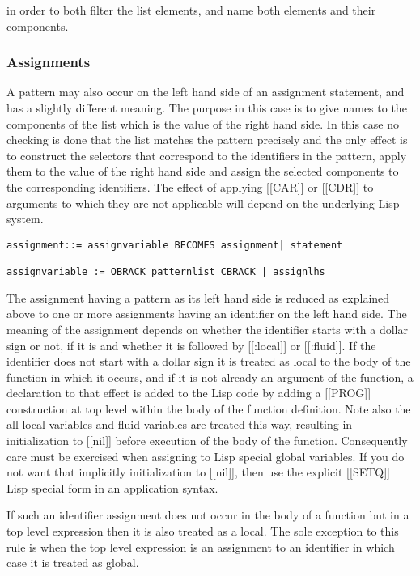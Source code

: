 \documentclass{article}
\begin{document}
in order to both filter the list elements, and name both elements and
their components.

\subsubsection{Assignments}
\label{sec:boot:assignment}

A pattern may also occur on the left hand side of an assignment
statement, and has a slightly different meaning.
The purpose in this case is to give names to the components
of the list which is the value of the right hand side.
In this case no checking
is done that the list matches the pattern precisely and the only
effect is to construct the selectors that correspond to
the identifiers in the pattern, apply them to the value of the
right hand side and assign the selected components
to the corresponding identifiers.
The effect of applying [[CAR]] or [[CDR]] to arguments to which they are not
applicable will depend on the underlying Lisp system.
\begin{verbatim}
assignment::= assignvariable BECOMES assignment| statement

assignvariable := OBRACK patternlist CBRACK | assignlhs
\end{verbatim}

The assignment having a pattern as its left hand side is reduced
as explained above to one or more assignments having an identifier
on the left hand side.
The meaning of the assignment depends on whether the identifier
starts with a dollar sign or not, if it is and whether it is followed by
[[:local]] or [[:fluid]].
If the identifier does not start with a dollar sign it
is treated as local to the body of the function in which it
occurs, and
if it is not already an argument of the function,
a declaration to that effect is added to the Lisp code
by adding a [[PROG]] construction at top level within the body of the
function definition.  Note also the all local variables and fluid variables
are treated this way, resulting in initialization to [[nil]] before
execution of the body of the function.  Consequently care must be
exercised when assigning to Lisp special global variables.  If you
do not want that implicitly initialization to [[nil]], then use the
explicit [[SETQ]] Lisp special form in an application syntax.

If such an identifier assignment does not occur in the body
of a function but in a top level expression then
it is also treated as a local. The sole exception to this rule
is when the top level expression is an assignment to an identifier
in which case it is treated as global.
\end{document}
